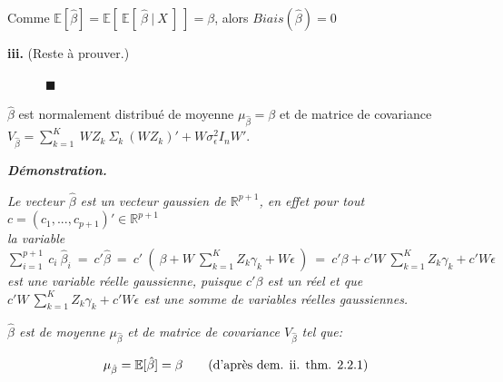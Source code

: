 \documentclass[11pt,fleqn]{book} %
\begin{document}
	\vspace{0.5em}
	
	Comme \:$\mathbb{E}[\hat{\beta}]=\mathbb{E}[\:\mathbb{E}[\:\hat{\beta}\:|\:X \:]\:]=\beta$,\: alors $Biais(\hat{\beta})=0$\\
	
	\vspace{0.5em}
	
	
	\textbf{iii.} (Reste à prouver.)
	
	
	\vspace{1em}
	
	$\quad\quad\quad \blacksquare$
	
	\newpage
	
	\begin{proposition}
		
		$\hat{\beta}$ est normalement distribué de moyenne  $\mu_{\hat{\beta}}=\beta$ et de matrice de covariance $V_{\hat{\beta}}=\sum_{k=1}^{K}\: W Z_k\: \Sigma_k \:(W Z_k)'+ W\sigma_{\epsilon}^2 I_n W'$.
		
	\end{proposition}
	
	\vspace{0.5em}
	
	\textit{\textbf{Démonstration.}}
	
	\vspace{0.5em}
	
	\textit{Le vecteur $\hat{\beta}$ est un vecteur gaussien de $\mathbb{R}^{p+1}$, en effet pour tout $c=(c_1, ... ,c_{p+1})'\in \mathbb{R}^{p+1}$\\ 
		la variable\: $\sum_{i=1}^{p+1}\:c_i\:\hat{\beta}_i\:=\:c'\hat{\beta}\:=\:c'\:\left(\: \beta + W \:\sum_{k=1}^{K} Z_k \gamma_k +W\epsilon\:\right)\:=\:c'\beta+c'  W \:\sum_{k=1}^{K} Z_k \gamma_k+c'W\epsilon $\\ 
		est une variable réelle gaussienne, puisque $c'\beta$ est un réel et que $c' W \:\sum_{k=1}^{K} Z_k \gamma_k+c'W\epsilon $ est une somme de variables réelles gaussiennes.}
	
	\vspace{1em}
	
	\textit{$\hat{\beta}$ est de moyenne $\mu_{\hat{\beta}}$ et de matrice de covariance $V_{\hat{\beta}}$ tel que:}
	
	\begin{align*}
		\mu_{\hat{\beta}}=\mathbb{E}[\hat{\beta}]=\beta \qquad\textnormal{(d'après dem. ii. thm. 2.2.1)}
	\end{align*}
	
\end{document}
